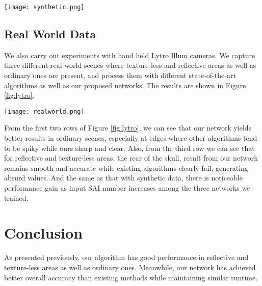 \documentclass[10pt,twocolumn,letterpaper]{article}
\begin{document}
\begin{figure*}
	\begin{center}
		\texttt{[image: synthetic.png]}
	\end{center}
	\caption{Synthetic data results. (a)central view (b)ground truth (c)\cite{shin2018epinet} (d)\cite{zhang2016robust} (e)\cite{jeon2015accurate} (f)Ours(VommaNet\_81)}
	\label{fig:synthetic}
\end{figure*}

\subsection{Real World Data}

We also carry out experiments with hand held Lytro Illum cameras. We capture three different real world scenes where texture-less and reflective areas as well as ordinary ones are present, and process them with different state-of-the-art algorithms as well as our proposed networks. The results are shown in Figure \ref{fig:lytro}.

\begin{figure*}
	\begin{center}
		\texttt{[image: realworld.png]}
	\end{center}
	\caption{Real world results. (a)thumbnail (b)\cite{shin2018epinet} (c)\cite{zhang2016robust} (d)\cite{jeon2015accurate} (e)Ours(VommaNet\_81)}
	\label{fig:lytro}
\end{figure*}

From the first two rows of Figure \ref{fig:lytro}, we can see that our network yields better results in ordinary scenes, especially at edges where other algorithms tend to be spiky while ours sharp and clear. Also, from the third row we can see that for reflective and texture-less areas, \eg the rear of the skull, result from our network remains smooth and accurate while existing algorithms clearly fail, generating absurd values. And the same as that with synthetic data, there is noticeable performance gain as input SAI number increases among the three networks we trained.

\section{Conclusion}

As presented previously, our algorithm has good performance in reflective and texture-less areas as well as ordinary ones. Meanwhile, our network has achieved better overall accuracy than existing methods while maintaining similar runtime.
\end{document}
